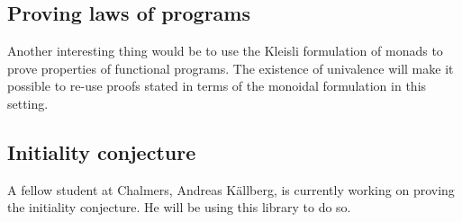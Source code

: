 \subsection{Proving laws of programs}
Another interesting thing would be to use the Kleisli formulation of
monads to prove properties of functional programs.  The existence of
univalence will make it possible to re-use proofs stated in terms of
the monoidal formulation in this setting.


\subsection{Initiality conjecture}
A fellow student at Chalmers, Andreas Källberg, is currently working
on proving the initiality conjecture.  He will be using this library
to do so.

